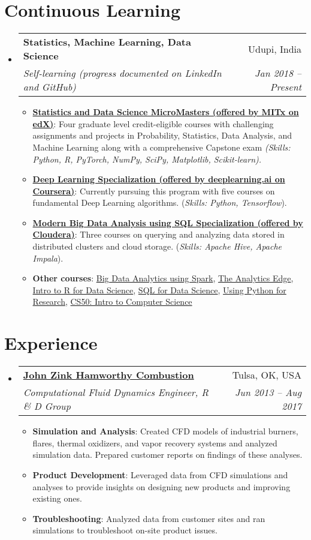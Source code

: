 \documentclass[letterpaper,11pt]{article}
\makeatletter
\newcommand{\resumeItem}[2]{
	\item\small{
		\textbf{#1}{: #2 \vspace{-2pt}}
	}
}
\newcommand{\resumeSubheading}[4]{
	\vspace{-1pt}\item
	\begin{tabular*}{0.97\textwidth}[t]{l@{\extracolsep{\fill}}r}
		\textbf{#1} & #2 \\
		\textit{\small#3} & \textit{\small #4} \\
	\end{tabular*}\vspace{-5pt}
}
\newcommand{\resumeSubHeadingListStart}{\begin{itemize}[leftmargin=*]}
\newcommand{\resumeSubHeadingListEnd}{\end{itemize}}
\newcommand{\resumeItemListStart}{\begin{itemize}}
\newcommand{\resumeItemListEnd}{\end{itemize}\vspace{-5pt}}
\makeatother
\begin{document}
	\section{Continuous Learning}
	\resumeSubHeadingListStart
	\resumeSubheading
	{Statistics, Machine Learning, Data Science}{Udupi, India}
	{Self-learning (progress documented on LinkedIn and GitHub)}{Jan 2018 -- Present}
	\resumeItemListStart
	\resumeItem{\href{https://www.edx.org/micromasters/mitx-statistics-and-data-science/}{Statistics and Data Science MicroMasters (offered by MITx on edX)}}
	{Four graduate level credit-eligible courses with challenging assignments and projects in Probability, Statistics, Data Analysis, and Machine Learning along with a comprehensive Capstone exam \textit {\small (Skills: Python, R, PyTorch, NumPy, SciPy, Matplotlib, Scikit-learn).}}
	\resumeItem{\href{https://www.coursera.org/specializations/deep-learning/}{Deep Learning Specialization (offered by deeplearning.ai on Coursera)}}
	{Currently pursuing this program with five courses on fundamental Deep Learning algorithms. (\textit{\small Skills: Python, Tensorflow}).}
	\resumeItem{\href{https://www.coursera.org/specializations/cloudera-big-data-analysis-sql/}{Modern Big Data Analysis using SQL Specialization (offered by Cloudera)}}
	{Three courses on querying and analyzing data stored in distributed clusters and cloud storage. (\textit{\small Skills: Apache Hive, Apache Impala}).}
	\resumeItem{Other courses}
	{\href{https://www.edx.org/course/big-data-analytics-using-spark-3/}{Big Data Analytics using Spark}, \href{https://www.edx.org/course/the-analytics-edge-2/}{The Analytics Edge}, \href{https://www.edx.org/course/introduction-to-r-for-data-science-3/}{Intro to R for Data Science}, \href{https://www.coursera.org/learn/sql-for-data-science/}{SQL for Data Science},  \href{https://www.edx.org/course/using-python-for-research-2}{Using Python for Research},  \href{https://www.edx.org/course/cs50s-introduction-computer-science-harvardx-cs50x/}{CS50: Intro to Computer Science}}
	\resumeItemListEnd
	\resumeSubHeadingListEnd

	\section{Experience}
	\resumeSubHeadingListStart
	
	\resumeSubheading
	{\href{https://www.johnzinkhamworthy.com/}{John Zink Hamworthy Combustion}}{Tulsa, OK, USA}
	{Computational Fluid Dynamics Engineer, R \& D Group}{Jun 2013 -- Aug 2017}
	\resumeItemListStart
	\resumeItem{Simulation and Analysis}
	{Created CFD models of industrial burners, flares, thermal oxidizers, and vapor recovery systems and analyzed simulation data. Prepared customer reports on findings of these analyses.}
	\resumeItem{Product Development}
	{Leveraged data from CFD simulations and analyses to provide insights on designing new products and improving existing ones.}
	\resumeItem{Troubleshooting}
	{Analyzed data from customer sites and ran simulations to troubleshoot on-site product issues.}
	\resumeItemListEnd
	\resumeSubHeadingListEnd
	
\end{document}
